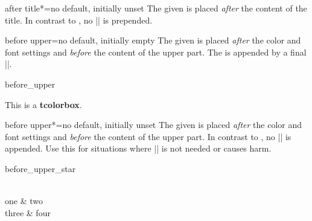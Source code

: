 \begin{docTcbKey}[][doc new=2023-01-27]{after title*}{=}{no default, initially unset}
  The given  is placed \emph{after} the content of the title.
  In contrast to , no |\unskip| is prepended.
\end{docTcbKey}


\clearpage
\begin{docTcbKey}{before upper}{=}{no default, initially empty}
  The given  is placed \emph{after} the color and font settings
  and \emph{before} the content of the upper part.
  The  is appended by a final |\ignorespaces|.
\begin{exdispExample}{before_upper}

\begin{tcolorbox}[title=My title]
This is a \textbf{tcolorbox}.
\end{tcolorbox}
\end{exdispExample}
\end{docTcbKey}


\begin{docTcbKey}[][doc new=2019-02-26]{before upper*}{=}{no default, initially unset}
  The given  is placed \emph{after} the color and font settings
  and \emph{before} the content of the upper part.
  In contrast to , no |\ignorespaces| is appended.
  Use this for situations where |\ignorespaces| is not needed or causes harm.
\begin{exdispExample}{before_upper_star}
\begin{tcolorbox}[size=small,tile,
  colback=yellow!20,colbacktitle=yellow!70!black,
  title=My table,hbox,center,center title,
  before upper*=\begin{tabular}{cc},
  after upper*=\end{tabular},
]
  \\
  one & two \\
  three & four\\
\end{tcolorbox}
\end{exdispExample}
\end{docTcbKey}

\clearpage

